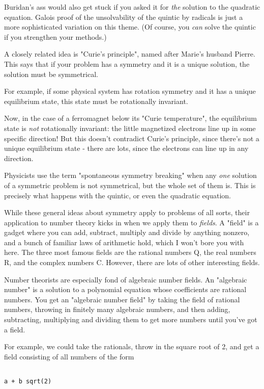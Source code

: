 Buridan's ass would also get stuck if you asked it for \emph{the} solution
to the quadratic equation.  Galois proof of the unsolvability of the 
quintic by radicals is just a more sophisticated variation on this theme.  
(Of course, you \emph{can} solve the quintic if you strengthen your methods.)

A closely related idea is "Curie's principle", named after Marie's 
husband Pierre.  This says that if your problem has a symmetry and 
it is a unique solution, the solution must be symmetrical. 

For example, if some physical system has rotation symmetry and it has a
unique equilibrium state, this state must be rotationally invariant.

Now, in the case of a ferromagnet below its "Curie temperature", the 
equilibrium state is \emph{not} rotationally invariant: the little magnetized
electrons line up in some specific direction!  But this doesn't 
contradict Curie's principle, since there's not a unique equilibrium 
state - there are lots, since the electrons can line up in any direction.  

Physicists use the term "spontaneous symmetry breaking" when any 
\emph{one}
solution of a symmetric problem is not symmetrical, but the whole set 
of them is.  This is precisely what happens with the quintic, or even 
the quadratic equation.

While these general ideas about symmetry apply to problems of all sorts,
their application to number theory kicks in when we apply them to \emph{fields}.  
A "field" is a gadget where you can add, subtract, multiply and divide
by anything nonzero, and a bunch of familiar laws of arithmetic hold, 
which I won't bore you with here.  The three most famous fields are the 
rational numbers Q, the real numbers R, and the complex numbers C.  
However, there are lots of other interesting fields.  

Number theorists are especially fond of algebraic number fields.  An 
"algebraic number" is a solution to a polynomial equation whose coefficients 
are rational numbers.  You get an "algebraic number field" by taking the 
field of rational numbers, throwing in finitely many algebraic numbers, and 
then adding, subtracting, multiplying and dividing them to get more numbers 
until you've got a field.  

For example, we could take the rationals, throw in the square root of 2, 
and get a field consisting of all numbers of the form


\begin{verbatim}

a + b sqrt(2)
\end{verbatim}
    
